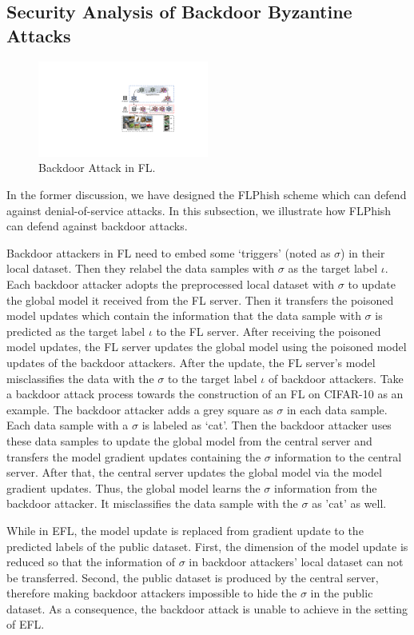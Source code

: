 \documentclass[lettersize,journal]{IEEEtran}
\begin{document}
\subsection{Security Analysis of Backdoor Byzantine Attacks}
\begin{figure}
\centering
\includegraphics[width=0.5\textwidth]{figures/Figure_backdoor.pdf}
\caption{Backdoor Attack in FL.}
\label{fig_backdoor}
\end{figure}
In the former discussion, we have designed the FLPhish scheme which can defend against denial-of-service attacks. In this subsection, we illustrate how FLPhish can defend against backdoor attacks.  
\par Backdoor attackers in FL need to embed some `triggers' (noted as $\sigma$) in their local dataset. Then they relabel the data samples with $\sigma$ as the target label $\iota$. Each backdoor attacker adopts the preprocessed local dataset with $\sigma$ to update the global model it received from the FL server. Then it transfers the poisoned model updates which contain the information that the data sample with $\sigma$ is predicted as the target label $\iota$ to the FL server. After receiving the poisoned model updates, the FL server updates the global model using the poisoned model updates of the backdoor attackers. After the update, the FL server's model misclassifies the data with the $\sigma$ to the target label $\iota$ of backdoor attackers. Take a backdoor attack process towards the construction of an FL on CIFAR-10 as an example. The backdoor attacker adds a grey square as $\sigma$ in each data sample. Each data sample with a $\sigma$ is labeled as `cat'. Then the backdoor attacker uses these data samples to update the global model from the central server and transfers the model gradient updates containing the $\sigma$ information to the central server. After that, the central server updates the global model via the model gradient updates. Thus, the global model learns the $\sigma$ information from the backdoor attacker. It misclassifies the data sample with the $\sigma$ as 'cat' as well.
\par While in EFL, the model update is replaced from gradient update to the predicted labels of the public dataset. First, the dimension of the model update is reduced so that the information of $\sigma$ in backdoor attackers' local dataset can not be transferred. Second, the public dataset is produced by the central server, therefore making backdoor attackers impossible to hide the $\sigma$ in the public dataset. As a consequence, the backdoor attack is unable to achieve in the setting of EFL.
\end{document}
